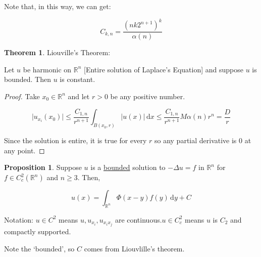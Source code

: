 \documentclass{article}
\theoremstyle{definition}
\newtheorem{theorem}{Theorem}
\newtheorem{proposition}{Proposition}
\begin{document}
Note that, in this way, we can get:

\[
    C_{k,n} = \frac{(nk 2^{n+1})^k}{\alpha (n)}
\]

\begin{theorem}
    Liouville's Theorem:

    Let \(u\) be harmonic on \(\mathbb{R}^n\) [Entire solution of Laplace's Equation] and suppose \(u\) is bounded. Then \(u\) is constant. 

\end{theorem}

\begin{proof}
    Take \(x_0\in\mathbb{R} ^n\) and let \(r>0\) be any positive number.

    \[
        \vert u_{x_i}(x_0) \vert \leq \frac{C_{1,n}}{r^{n+1}} \int_{B(x_0,r)}^{} \vert u(x) \vert  \,\mathrm{d}x \leq \frac{C_{1,n}}{r^{n+1}} M \alpha (n) r^n = \frac{D}{r}
    \] 

    Since the solution is entire, it is true for every \(r\) so any partial derivative is \(0\) at any point.

\end{proof}

\begin{proposition}
    Suppose \(u\) is a \underline{bounded} solution to \(- \Delta u=f\) in \(\mathbb{R} ^n\) for \(f\in C_c^2(\mathbb{R}^n)\) and \(n\geq 3\). Then,

    \[
        u(x)=\int_{\mathbb{R}^n}^{} \Phi(x-y)f(y) \,\mathrm{d}y  + C
    \]

    Notation: \(u\in C^2\) means \(u, u_{x_i}, u_{x_i x_j}\) are continuous.\(u \in C_c^2\) means \(u\) is \(C_2\) and compactly supported.
    
    Note the `bounded', so \(C\) comes from Liouvlille's theorem.

\end{proposition}
\end{document}
